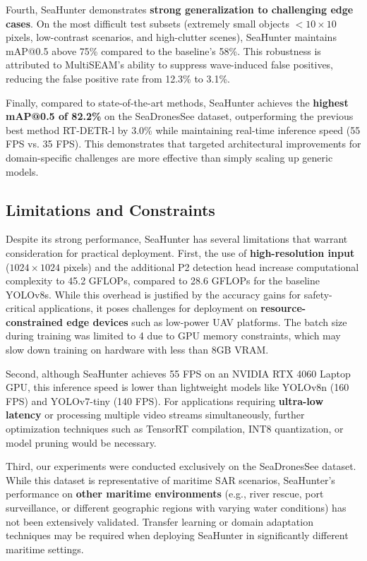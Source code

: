 \documentclass[lettersize,journal]{IEEEtran}
\begin{document}
Fourth, SeaHunter demonstrates \textbf{strong generalization to challenging edge cases}. On the most difficult test subsets (extremely small objects $< 10 \times 10$ pixels, low-contrast scenarios, and high-clutter scenes), SeaHunter maintains mAP@0.5 above 75\% compared to the baseline's 58\%. This robustness is attributed to MultiSEAM's ability to suppress wave-induced false positives, reducing the false positive rate from 12.3\% to 3.1\%.

Finally, compared to state-of-the-art methods, SeaHunter achieves the \textbf{highest mAP@0.5 of 82.2\%} on the SeaDronesSee dataset, outperforming the previous best method RT-DETR-l by 3.0\% while maintaining real-time inference speed (55 FPS vs. 35 FPS). This demonstrates that targeted architectural improvements for domain-specific challenges are more effective than simply scaling up generic models.

\subsection{Limitations and Constraints}

Despite its strong performance, SeaHunter has several limitations that warrant consideration for practical deployment. First, the use of \textbf{high-resolution input} ($1024 \times 1024$ pixels) and the additional P2 detection head increase computational complexity to 45.2 GFLOPs, compared to 28.6 GFLOPs for the baseline YOLOv8s. While this overhead is justified by the accuracy gains for safety-critical applications, it poses challenges for deployment on \textbf{resource-constrained edge devices} such as low-power UAV platforms. The batch size during training was limited to 4 due to GPU memory constraints, which may slow down training on hardware with less than 8GB VRAM.

Second, although SeaHunter achieves 55 FPS on an NVIDIA RTX 4060 Laptop GPU, this inference speed is lower than lightweight models like YOLOv8n (160 FPS) and YOLOv7-tiny (140 FPS). For applications requiring \textbf{ultra-low latency} or processing multiple video streams simultaneously, further optimization techniques such as TensorRT compilation, INT8 quantization, or model pruning would be necessary.

Third, our experiments were conducted exclusively on the SeaDronesSee dataset. While this dataset is representative of maritime SAR scenarios, SeaHunter's performance on \textbf{other maritime environments} (e.g., river rescue, port surveillance, or different geographic regions with varying water conditions) has not been extensively validated. Transfer learning or domain adaptation techniques may be required when deploying SeaHunter in significantly different maritime settings.
\end{document}
